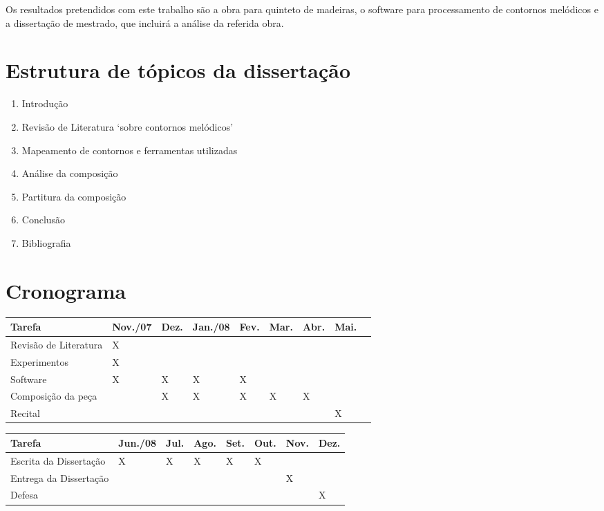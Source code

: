 \documentclass{article}
\begin{document}
Os resultados pretendidos com este trabalho são a obra para quinteto
de madeiras, o software para processamento de contornos melódicos e a
dissertação de mestrado, que incluirá a análise da referida obra.

\section{Estrutura de tópicos da dissertação}
\label{sec:estrutura-de-topicos}

\begin{enumerate}
\item Introdução
\item Revisão de Literatura `sobre contornos melódicos'
\item Mapeamento de contornos e ferramentas utilizadas
\item Análise da composição
\item Partitura da composição
\item Conclusão
\item Bibliografia
\end{enumerate}

\section{Cronograma}
\label{sec:cronograma}

\begin{table}[h]
  \begin{tabular}{lllllllll}
    \hline
    Tarefa & Nov./07 & Dez. & Jan./08 & Fev. & Mar. & Abr. & Mai. \\
    \hline
    Revisão de Literatura & X &  &  & & & & & \\
    Experimentos & X & & & & & & & \\
    Software & X & X & X & X & & & &  \\
    Composição da peça & & X & X & X & X & X \\
    Recital & &  & & & & & X \\
    \hline
  \end{tabular}
  \begin{tabular}{llllllll}
    \hline
    Tarefa & Jun./08 & Jul. & Ago. & Set. & Out. & Nov. & Dez. \\
    \hline
    Escrita da Dissertação & X & X & X & X & X & & \\
    Entrega da Dissertação & & & & & & X & \\
    Defesa & & & & & & & X \\
    \hline
  \end{tabular}

  \label{tab:cronograma}
\end{table}
\end{document}
